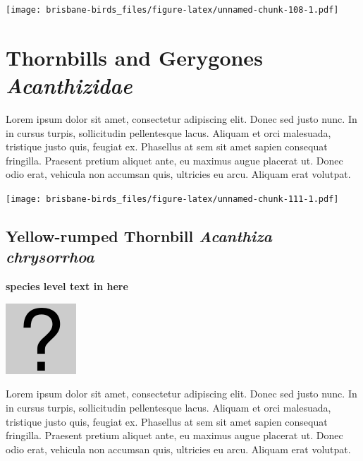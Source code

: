 \documentclass[]{book}
\let\origfigure\figure
\let\endorigfigure\endfigure
\renewenvironment{figure}[1][2] {
  \expandafter\origfigure\expandafter[H]
} {
  \endorigfigure
}
\begin{document}
\begin{figure}
\centering
\texttt{[image: brisbane-birds\_files/figure-latex/unnamed-chunk-108-1.pdf]}
\caption{\label{fig:unnamed-chunk-108}insert figure caption}
\end{figure}

\chapter{\texorpdfstring{Thornbills and Gerygones
\emph{Acanthizidae}}{Thornbills and Gerygones Acanthizidae}}\label{thornbills-and-gerygones-acanthizidae}

Lorem ipsum dolor sit amet, consectetur adipiscing elit. Donec sed justo
nunc. In in cursus turpis, sollicitudin pellentesque lacus. Aliquam et
orci malesuada, tristique justo quis, feugiat ex. Phasellus at sem sit
amet sapien consequat fringilla. Praesent pretium aliquet ante, eu
maximus augue placerat ut. Donec odio erat, vehicula non accumsan quis,
ultricies eu arcu. Aliquam erat volutpat.

\texttt{[image: brisbane-birds\_files/figure-latex/unnamed-chunk-111-1.pdf]}

\section{\texorpdfstring{Yellow-rumped Thornbill \emph{Acanthiza
chrysorrhoa}}{Yellow-rumped Thornbill Acanthiza chrysorrhoa}}\label{yellow-rumped-thornbill-acanthiza-chrysorrhoa}

\textbf{species level text in here}

\begin{figure}
\centering
\includegraphics{assets/missing.png}
\caption{No image for species}
\end{figure}

Lorem ipsum dolor sit amet, consectetur adipiscing elit. Donec sed justo
nunc. In in cursus turpis, sollicitudin pellentesque lacus. Aliquam et
orci malesuada, tristique justo quis, feugiat ex. Phasellus at sem sit
amet sapien consequat fringilla. Praesent pretium aliquet ante, eu
maximus augue placerat ut. Donec odio erat, vehicula non accumsan quis,
ultricies eu arcu. Aliquam erat volutpat.
\end{document}
